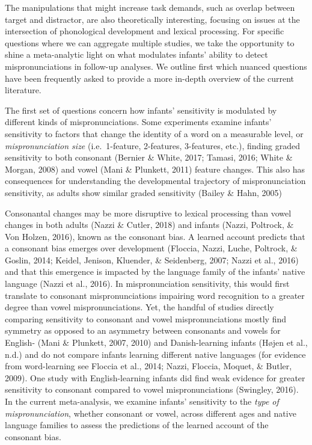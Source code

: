 \documentclass[man]{apa6}
\begin{document}
The manipulations that might increase task demands, such as overlap between target and distractor, are also theoretically interesting, focusing on issues at the intersection of phonological development and lexical processing. For specific questions where we can aggregate multiple studies, we take the opportunity to shine a meta-analytic light on what modulates infants' ability to detect mispronunciations in follow-up analyses. We outline first which nuanced questions have been frequently asked to provide a more in-depth overview of the current literature.

The first set of questions concern how infants' sensitivity is modulated by different kinds of mispronunciations. Some experiments examine infants' sensitivity to factors that change the identity of a word on a measurable level, or \emph{mispronunciation size} (i.e.~1-feature, 2-features, 3-features, etc.), finding graded sensitivity to both consonant (Bernier \& White, 2017; Tamasi, 2016; White \& Morgan, 2008) and vowel (Mani \& Plunkett, 2011) feature changes. This also has consequences for understanding the developmental trajectory of mispronunciation sensitivity, as adults show similar graded sensitivity (Bailey \& Hahn, 2005)

Consonantal changes may be more disruptive to lexical processing than vowel changes in both adults (Nazzi \& Cutler, 2018) and infants (Nazzi, Poltrock, \& Von Holzen, 2016), known as the consonant bias. A learned account predicts that a consonant bias emerges over development (Floccia, Nazzi, Luche, Poltrock, \& Goslin, 2014; Keidel, Jenison, Kluender, \& Seidenberg, 2007; Nazzi et al., 2016) and that this emergence is impacted by the language family of the infants' native language (Nazzi et al., 2016). In mispronunciation sensitivity, this would first translate to consonant mispronunciations impairing word recognition to a greater degree than vowel mispronunciations. Yet, the handful of studies directly comparing sensitivity to consonant and vowel mispronunciations mostly find symmetry as opposed to an asymmetry between consonants and vowels for English- (Mani \& Plunkett, 2007, 2010) and Danish-learning infants (Højen et al., n.d.) and do not compare infants learning different native languages (for evidence from word-learning see Floccia et al., 2014; Nazzi, Floccia, Moquet, \& Butler, 2009). One study with English-learning infants did find weak evidence for greater sensitivity to consonant compared to vowel mispronunciations (Swingley, 2016). In the current meta-analysis, we examine infants' sensitivity to the \emph{type of mispronunciation}, whether consonant or vowel, across different ages and native language families to assess the predictions of the learned account of the consonant bias.
\end{document}
